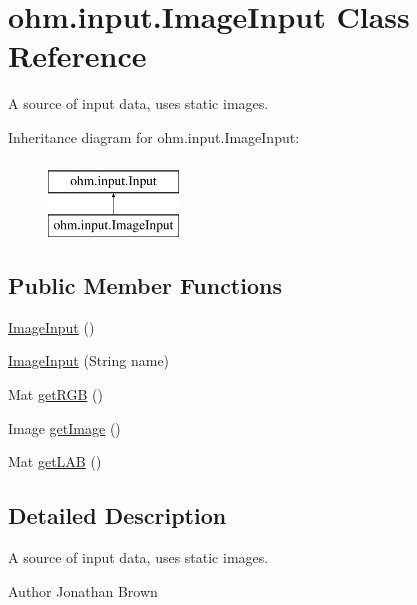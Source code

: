\hypertarget{classohm_1_1input_1_1_image_input}{}\section{ohm.\+input.\+Image\+Input Class Reference}
\label{classohm_1_1input_1_1_image_input}


A source of input data, uses static images.  


Inheritance diagram for ohm.\+input.\+Image\+Input\+:\begin{figure}[H]
\begin{center}
\leavevmode
\includegraphics[height=2.000000cm]{classohm_1_1input_1_1_image_input}
\end{center}
\end{figure}
\subsection*{Public Member Functions}
\begin{DoxyCompactItemize}
\item 
\hyperlink{classohm_1_1input_1_1_image_input_af8fb2e251e80452993fd0400ae596628}{Image\+Input} ()
\item 
\hyperlink{classohm_1_1input_1_1_image_input_a3c9f1be5fc0574d2e2470c86fb1dbe90}{Image\+Input} (String name)
\item 
Mat \hyperlink{classohm_1_1input_1_1_image_input_aad0a18c0396fba14d5e1d74c08a592e6}{get\+R\+GB} ()
\item 
Image \hyperlink{classohm_1_1input_1_1_image_input_a68160a9bd9d395f7b2646e9b55388198}{get\+Image} ()
\item 
Mat \hyperlink{classohm_1_1input_1_1_image_input_a4f55591040c8129f3768948525d34863}{get\+L\+AB} ()
\end{DoxyCompactItemize}


\subsection{Detailed Description}
A source of input data, uses static images. 

\begin{DoxyAuthor}{Author}
Jonathan Brown 
\end{DoxyAuthor}


